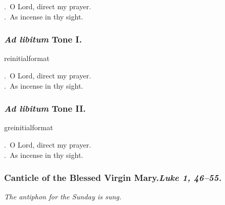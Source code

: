 \documentclass[12pt]{article} %
\newcommand{\myaboveinitial}[1]{%
    \expandafter\renewcommand\csname greinitialformat\endcsname[1]{%
        \fontsize{43}{43}\selectfont ##1
    }
    \gresetfirstlineaboveinitial{\textcolor{benred8}{\raisebox{6.0mm}{\small \textsc{\textbf{#1}}}}}{}
}
\newenvironment{rubric}{\vspace{2 mm}\color{benred8} \itshape \leftskip 0in \setlength{\parindent}{0.25in}}{\vspace{2 mm}}
\newenvironment{response}{\leftskip 0in \setlength{\parindent}{0in}}{\vspace{2 mm}}
\let\oldVbar\Vbar
\renewcommand{\Vbar}{\textcolor{benred8}{\oldVbar .}}
\let\oldRbar\Rbar
\renewcommand{\Rbar}{\textcolor{benred8}{\oldRbar .}}
\def\capitulumSpace{\hspace{20 mm}}
\begin{document}
\begin{pages}
\begin{Rightside}
\begin{response}
\Vbar\ O Lord, direct my prayer.\\
\Rbar\ As incense in thy sight.

\end{response}

\pend\pstart


\subsubsection*{\emph{Ad libitum} Tone I.}

\pend\pstart

\myaboveinitial{VIII}

\pend\pstart

\begin{response}
\Vbar\ O Lord, direct my prayer.\\
\Rbar\ As incense in thy sight.

\end{response}

\pend\pstart


\subsubsection*{\emph{Ad libitum} Tone II.}

\pend\pstart

\myaboveinitial{I}

\pend\pstart

\begin{response}
\Vbar\ O Lord, direct my prayer.\\
\Rbar\ As incense in thy sight.

\end{response}

\pend\pstart


\subsubsection*{Canticle of the Blessed Virgin Mary.\capitulumSpace \emph{Luke 1, 46--55.}}

\pend\pstart

\begin{rubric}
The antiphon for the Sunday is sung.


\end{rubric}
\end{Rightside}
\end{pages}
\end{document}
